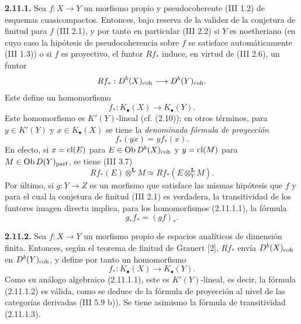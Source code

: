 \textbf{2.11.1.} Sea \(f:X\to Y\) un morfismo propio y pseudocoherente (III 1.2) de esquemas cuasicompactos. Entonces, bajo reserva de la validez de la conjetura de finitud para \(f\) (III 2.1), y por tanto en particular (III 2.2) si \(Y\) es noetheriano (en cuyo caso la hipótesis de pseudocoherencia sobre \(f\) se satisface automáticamente (III 1.3)) o si \(f\) es proyectivo, el funtor \(Rf_*\) induce, en virtud de (III 2.6), un funtor
\[
 Rf_*:D^b(X)_{\mathrm{coh}}\longrightarrow D^b(Y)_{\mathrm{coh}}.
\]
Este define un homomorfismo
\begin{equation}\tag{2.11.1.1}
 f_*:K_{\bullet}(X)\longrightarrow K_{\bullet}(Y).
\end{equation}
Este homomorfismo es \(K'(Y)\)-lineal (cf. (2.10)); en otros términos, para \(y\in K'(Y)\) y \(x\in K_{\bullet}(X)\) se tiene la \emph{denominada fórmula de proyección}
\begin{equation}\tag{2.11.1.2}
 f_*(yx)=y f_*(x).
\end{equation}
En efecto, si \(x=\operatorname{cl}(E)\) para \(E\in\operatorname{Ob} D^b(X)_{\mathrm{coh}}\) y \(y=\operatorname{cl}(M)\) para \(M\in\operatorname{Ob} D(Y)_{\mathrm{parf}}\), se tiene (III 3.7)
\[
 Rf_*(E)\otimes^{\mathbf L}M\simeq
 Rf_*(E\otimes_Y^{\mathbf L}M).
\]
Por último, si \(g:Y\to Z\) es un morfismo que satisface las mismas hipótesis que \(f\) y para el cual la conjetura de finitud (III 2.1) es verdadera, la transitividad de los funtores imagen directa implica, para los homomorfismos (2.11.1.1), la fórmula
\begin{equation}\tag{2.11.1.3}
 g_*f_*=(gf)_*.
\end{equation}

\textbf{2.11.2.} Sea \(f:X\to Y\) un morfismo propio de espacios analíticos de dimensión finita. Entonces, según el teorema de finitud de Grauert [2], \(Rf_*\) envía \(D^b(X)_{\mathrm{coh}}\) en \(D^b(Y)_{\mathrm{coh}}\), y define por tanto un homomorfismo
\begin{equation}\tag{2.11.2.1}
 f_*:K_{\bullet}(X)\longrightarrow K_{\bullet}(Y).
\end{equation}
Como su análogo algebraico (2.11.1.1), este es \(K'(Y)\)-lineal, es decir, la fórmula (2.11.1.2) es válida, como se deduce de la fórmula de proyección al nivel de las categorías derivadas (III 5.9 b)). Se tiene asimismo la fórmula de transitividad (2.11.1.3).

